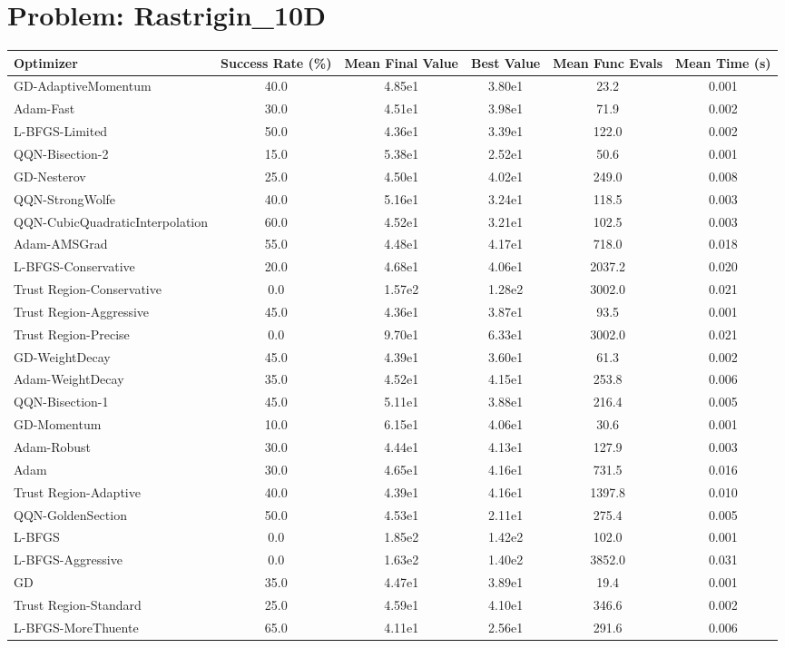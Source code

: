 \documentclass{article}
\begin{document}
\section{Problem: Rastrigin\_10D}
\begin{longtable}{p{3cm}*{5}{c}}
\toprule
\textbf{Optimizer} & \textbf{Success Rate (\%)} & \textbf{Mean Final Value} & \textbf{Best Value} & \textbf{Mean Func Evals} & \textbf{Mean Time (s)} \\
\midrule
GD-AdaptiveMomentum & 40.0 & 4.85e1 & 3.80e1 & 23.2 & 0.001 \\
Adam-Fast & 30.0 & 4.51e1 & 3.98e1 & 71.9 & 0.002 \\
L-BFGS-Limited & 50.0 & 4.36e1 & 3.39e1 & 122.0 & 0.002 \\
QQN-Bisection-2 & 15.0 & 5.38e1 & 2.52e1 & 50.6 & 0.001 \\
GD-Nesterov & 25.0 & 4.50e1 & 4.02e1 & 249.0 & 0.008 \\
QQN-StrongWolfe & 40.0 & 5.16e1 & 3.24e1 & 118.5 & 0.003 \\
QQN-CubicQuadraticInterpolation & 60.0 & 4.52e1 & 3.21e1 & 102.5 & 0.003 \\
Adam-AMSGrad & 55.0 & 4.48e1 & 4.17e1 & 718.0 & 0.018 \\
L-BFGS-Conservative & 20.0 & 4.68e1 & 4.06e1 & 2037.2 & 0.020 \\
Trust Region-Conservative & 0.0 & 1.57e2 & 1.28e2 & 3002.0 & 0.021 \\
Trust Region-Aggressive & 45.0 & 4.36e1 & 3.87e1 & 93.5 & 0.001 \\
Trust Region-Precise & 0.0 & 9.70e1 & 6.33e1 & 3002.0 & 0.021 \\
GD-WeightDecay & 45.0 & 4.39e1 & 3.60e1 & 61.3 & 0.002 \\
Adam-WeightDecay & 35.0 & 4.52e1 & 4.15e1 & 253.8 & 0.006 \\
QQN-Bisection-1 & 45.0 & 5.11e1 & 3.88e1 & 216.4 & 0.005 \\
GD-Momentum & 10.0 & 6.15e1 & 4.06e1 & 30.6 & 0.001 \\
Adam-Robust & 30.0 & 4.44e1 & 4.13e1 & 127.9 & 0.003 \\
Adam & 30.0 & 4.65e1 & 4.16e1 & 731.5 & 0.016 \\
Trust Region-Adaptive & 40.0 & 4.39e1 & 4.16e1 & 1397.8 & 0.010 \\
QQN-GoldenSection & 50.0 & 4.53e1 & 2.11e1 & 275.4 & 0.005 \\
L-BFGS & 0.0 & 1.85e2 & 1.42e2 & 102.0 & 0.001 \\
L-BFGS-Aggressive & 0.0 & 1.63e2 & 1.40e2 & 3852.0 & 0.031 \\
GD & 35.0 & 4.47e1 & 3.89e1 & 19.4 & 0.001 \\
Trust Region-Standard & 25.0 & 4.59e1 & 4.10e1 & 346.6 & 0.002 \\
L-BFGS-MoreThuente & 65.0 & 4.11e1 & 2.56e1 & 291.6 & 0.006 \\
\bottomrule
\end{longtable}
\end{document}
